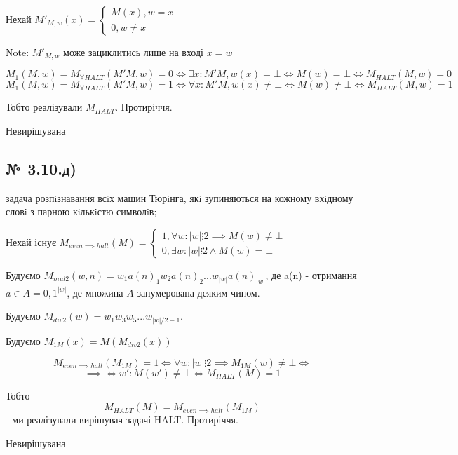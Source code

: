 \documentclass[11pt, a4paper]{article} %
\begin{document}
Нехай $M'_{M,w}(x) = \begin{cases}
    M(x), w = x\\
    0, w \ne x
\end{cases}$

Note: $M'_{M,w}$ може зациклитись лише на вході $x=w$

$$M_1(M,w) = M_{\forall HALT}(M'{M,w}) = 0 \iff \exists x: M'{M,w}(x) = \bot \iff M(w) = \bot \iff M_{HALT}(M,w) = 0$$
$$M_1(M,w) = M_{\forall HALT}(M'{M,w}) = 1 \iff \forall x: M'{M,w}(x) \ne \bot \iff M(w) \ne \bot \iff M_{HALT}(M,w) = 1$$

Тобто реалізували $M_{HALT}$. Протиріччя.
\begin{mdframed}[backgroundcolor=red!20]
    Невирішувана
\end{mdframed}



\subsection*{№ 3.10.д)}
\begin{mdframed}
    задача розпiзнавання всiх машин Тюрiнга, якi зупиняються на кожному
    вхiдному словi з парною кiлькiстю символiв;
\end{mdframed}

Нехай існує $M_{even\implies halt}(M) = \begin{cases}
    1, \forall w: |w|\vdots 2 \implies M(w) \ne \bot\\
    0, \exists w: |w|\vdots 2 \wedge M(w) = \bot
\end{cases}$

Будуємо $M_{mul2}(w,n) = w_1a(n)_1w_2a(n)_2...w_{|w|}a(n)_{|w|}$, 
де a(n) - отримання $a \in A = {0,1}^|w|$, де множина $A$ занумерована деяким чином. 

Будуємо $M_{div2}(w) = w_1w_3w_5...w_{|w|/2-1}$.

Будуємо $M_{1M}(x) = M(M_{div2}(x))$

$$M_{even\implies halt}(M_{1M}) = 1 \iff \forall w: |w|\vdots 2 \implies M_{1M}(w) \ne \bot \iff$$
$$\implies \iff w': M(w') \ne \bot \iff M_{HALT}(M) = 1$$

Тобто 
$$M_{HALT}(M) = M_{even\implies halt}(M_{1M})$$ - ми реалізували вирішувач задачі HALT. Протиріччя.

\begin{mdframed}[backgroundcolor=red!20]
    Невирішувана
\end{mdframed}


\pagebreak
\end{document}
